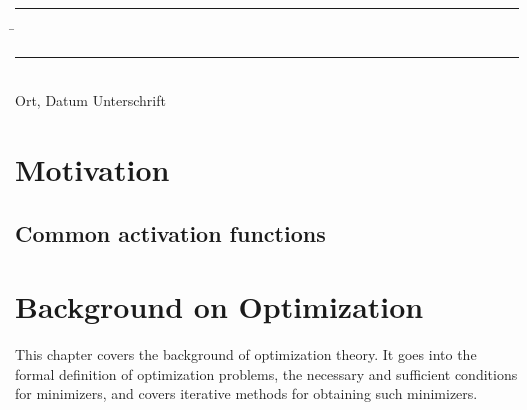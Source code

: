 \documentclass[12pt]{article}
\theoremstyle{definition}
\numberwithin{equation}{section}
\begin{document}
\vspace*{3em}

\begin{tabbing}
  \rule{.4\textwidth}{1pt} \hspace*{.2\textwidth}
  \= \rule{.4\textwidth}{1pt} \\
  Ort, Datum \> Unterschrift
\end{tabbing}

\newpage
\mbox{}
\newpage
\tableofcontents
\newpage
\listoffigures
\newpage

\section{Motivation}
\label{sec:Motivation}
\subsection{Common activation functions}
\section{Background on Optimization}
\label{sec:Optimization}
This chapter covers the background of optimization theory. It goes into the formal definition of optimization problems, the necessary and sufficient conditions for minimizers, and covers iterative methods for obtaining such minimizers.
\end{document}
